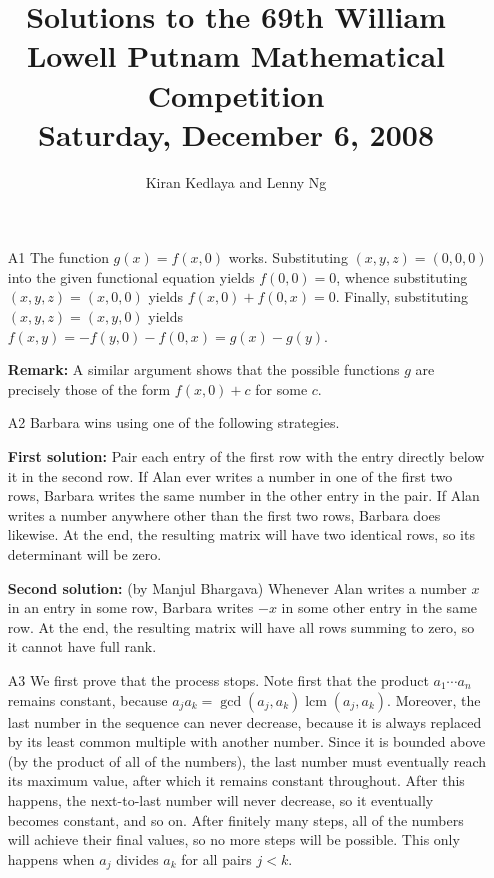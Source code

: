 \documentclass[amssymb,twocolumn,pra,10pt,aps]{revtex4-1}
\DeclareMathOperator{\lcm}{lcm}
\begin{document}
\title{Solutions to the 69th William Lowell Putnam Mathematical Competition \\
    Saturday, December 6, 2008}
\author{Kiran Kedlaya and Lenny Ng}
\noaffiliation
\maketitle

\begin{itemize}

\item[A1]
The function $g(x) = f(x,0)$ works. Substituting $(x,y,z) = (0,0,0)$ into the given functional equation yields $f(0,0) = 0$, whence substituting $(x,y,z) = (x,0,0)$ yields $f(x,0)+f(0,x)=0$. Finally, substituting $(x,y,z) = (x,y,0)$ yields $f(x,y) = -f(y,0)-f(0,x) = g(x)-g(y)$.

\textbf{Remark:} A similar argument shows that the possible functions $g$
are precisely those of the form  $f(x,0) + c$ for some $c$.

\item[A2]
Barbara wins using one of the following strategies.

\textbf{First solution:}
Pair each entry of the first row with the entry directly below it in
the second row. If Alan ever writes a number in one of the first two
rows, Barbara writes the same number in the other entry in the pair.
If Alan writes a number anywhere other than the first two rows, Barbara
does likewise.
At the end, the resulting matrix will have two identical rows, so its
determinant will be zero.

\textbf{Second solution:} (by Manjul Bhargava)
Whenever Alan writes a number $x$ in an entry in some row, Barbara writes
$-x$ in some other entry in the same row.
At the end, the resulting matrix will have all rows summing to zero,
so it cannot have full rank.

\item[A3]
We first prove that the process stops. Note first that the product
$a_1 \cdots a_n$ remains constant, because
$a_j a_k = \gcd(a_j, a_k) \lcm(a_j, a_k)$. Moreover,
the last number in the sequence can never decrease, because it is always
replaced by its least common multiple with another number.
Since it is bounded above (by the product
of all of the numbers), the last number must eventually reach its
maximum value, after which it remains constant throughout. After this
happens, the next-to-last number will never decrease, so it eventually
becomes constant, and so on. After finitely many steps, all of the numbers
will achieve their final values, so
no more steps will be possible. This only happens when
$a_j$ divides $a_k$ for all pairs $j < k$.


\end{itemize}
\end{document}
